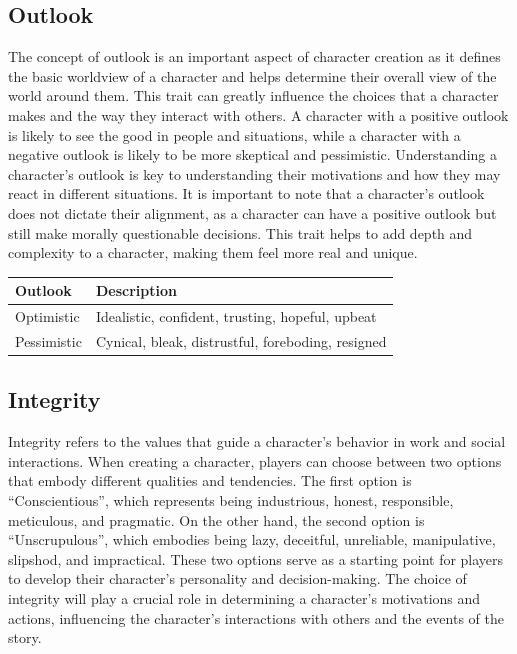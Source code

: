 \hypertarget{outlook}{%
\subsection{Outlook}\label{outlook}}

The concept of outlook is an important aspect of character creation as
it defines the basic worldview of a character and helps determine their
overall view of the world around them. This trait can greatly influence
the choices that a character makes and the way they interact with
others. A character with a positive outlook is likely to see the good in
people and situations, while a character with a negative outlook is
likely to be more skeptical and pessimistic. Understanding a character's
outlook is key to understanding their motivations and how they may react
in different situations. It is important to note that a character's
outlook does not dictate their alignment, as a character can have a
positive outlook but still make morally questionable decisions. This
trait helps to add depth and complexity to a character, making them feel
more real and unique.

\begin{longtable}[]{@{}ll@{}}
\toprule
Outlook & Description \\
\midrule
\endhead
Optimistic & Idealistic, confident, trusting, hopeful, upbeat \\
Pessimistic & Cynical, bleak, distrustful, foreboding, resigned \\
\bottomrule
\end{longtable}

\hypertarget{integrity}{%
\subsection{Integrity}\label{integrity}}

Integrity refers to the values that guide a character's behavior in work
and social interactions. When creating a character, players can choose
between two options that embody different qualities and tendencies. The
first option is ``Conscientious'', which represents being industrious,
honest, responsible, meticulous, and pragmatic. On the other hand, the
second option is ``Unscrupulous'', which embodies being lazy, deceitful,
unreliable, manipulative, slipshod, and impractical. These two options
serve as a starting point for players to develop their character's
personality and decision-making. The choice of integrity will play a
crucial role in determining a character's motivations and actions,
influencing the character's interactions with others and the events of
the story.

